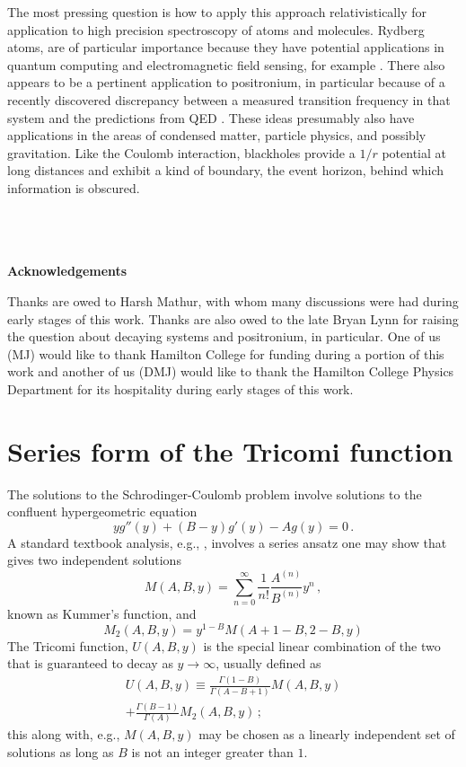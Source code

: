 \documentclass[pra,twocolumn,nofootinbib, superscriptaddress]{revtex4}%
\def\sec#1{\section{#1} }
\def\({\left(}
\def\){\right)}
\def\f#1#2{\frac{#1}{#2}}
\begin{document}
The most pressing question is how to apply this approach relativistically for application to high precision spectroscopy of atoms and molecules. Rydberg atoms, are of particular importance because they have potential applications in quantum computing and electromagnetic field sensing, for example \cite{Adams_2019}.  There also appears to be a pertinent application to positronium, in particular because of a recently discovered discrepancy between a measured transition frequency in that system and the predictions from QED \cite{Gurung:2020hms}. These ideas presumably also have applications in the areas of condensed matter, particle physics, and possibly gravitation. Like the Coulomb interaction, blackholes provide a $1/r$ potential at long distances and exhibit a kind of boundary, the event horizon, behind which information is obscured. 
\\\\\\\\
\begin{center}
{\bf Acknowledgements}\\
\end{center}
Thanks are owed to Harsh Mathur, with whom many discussions were had during early stages of this work. Thanks are also owed to the late Bryan Lynn for raising the question about decaying systems and positronium, in particular. One of us (MJ) would like to thank Hamilton College for funding during a portion of this work and another of us (DMJ) would like to thank the Hamilton College Physics Department for its hospitality  during early stages of this work.

\appendix


\sec{Series form of the Tricomi function}\label{Appendix_Tricomi}
The solutions to the Schrodinger-Coulomb problem involve solutions to the confluent hypergeometric equation
\begin{equation}\label{CHE}
y g''(y) + \(B-y\)g'(y)    -Ag(y)=0\,.
\end{equation}
A standard textbook analysis, e.g., \cite{arfken2005mathematical}, involves a series ansatz one may show that gives two independent solutions
\begin{equation}
M(A,B,y)=\sum_{n=0}^\infty  \f{1}{n!}\f{A^{(n)}}{B^{(n)}} y^{n}\,,
\end{equation}
known as Kummer's function, and
\begin{equation}
M_2(A,B,y)=y^{1-B}  M(A+1-B,2-B,y)
\end{equation}
The Tricomi function, $U(A,B,y)$ is the special linear combination of the two that is guaranteed to decay as $y\to \infty$, usually defined as
\begin{multline}
U(A,B,y)\equiv  \f{\Gamma{(1-B)}}{\Gamma{(A-B+1)}}  M(A,B,y)\\
+ \f{\Gamma(B-1)}{\Gamma(A)} M_2(A,B,y)\,;
\end{multline}
this along with, e.g., $M(A,B,y)$ may be chosen as a linearly independent set of solutions as long as $B$ is not an integer greater than $1$.
\end{document}
